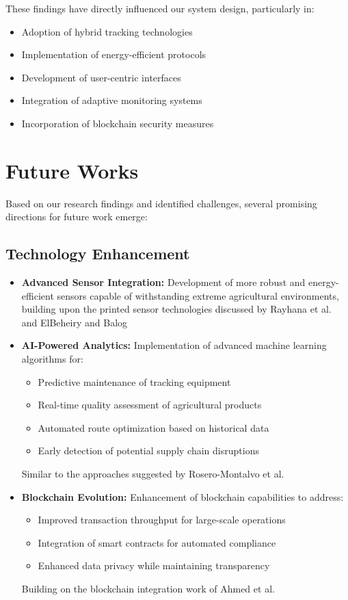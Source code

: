 \documentclass[conference]{IEEEtran}
\begin{document}
These findings have directly influenced our system design, particularly in:
\begin{itemize}
    \item Adoption of hybrid tracking technologies
    \item Implementation of energy-efficient protocols
    \item Development of user-centric interfaces
    \item Integration of adaptive monitoring systems
    \item Incorporation of blockchain security measures
\end{itemize}

\section{Future Works}
Based on our research findings and identified challenges, several promising directions for future work emerge:

\subsection{Technology Enhancement}
\begin{itemize}
    \item \textbf{Advanced Sensor Integration:} Development of more robust and energy-efficient sensors capable of withstanding extreme agricultural environments, building upon the printed sensor technologies discussed by Rayhana et al. \cite{rayhana2021rfid} and ElBeheiry and Balog \cite{elbeheiry2023technologies}
    
    \item \textbf{AI-Powered Analytics:} Implementation of advanced machine learning algorithms for:
    \begin{itemize}
        \item Predictive maintenance of tracking equipment
        \item Real-time quality assessment of agricultural products
        \item Automated route optimization based on historical data
        \item Early detection of potential supply chain disruptions
    \end{itemize}
    Similar to the approaches suggested by Rosero-Montalvo et al. \cite{rosero2023smart}
    
    \item \textbf{Blockchain Evolution:} Enhancement of blockchain capabilities to address:
    \begin{itemize}
        \item Improved transaction throughput for large-scale operations
        \item Integration of smart contracts for automated compliance
        \item Enhanced data privacy while maintaining transparency
    \end{itemize}
    Building on the blockchain integration work of Ahmed et al. \cite{ahmed2024optimized}
\end{itemize}
\end{document}
